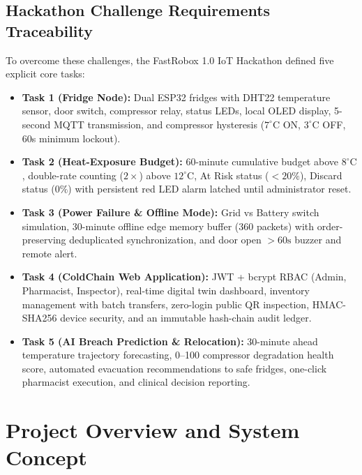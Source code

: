 \documentclass[11pt,a4paper]{article}
\begin{document}
\subsection{Hackathon Challenge Requirements Traceability}
To overcome these challenges, the FastRobox 1.0 IoT Hackathon defined five explicit core tasks:
\begin{itemize}[leftmargin=2em,itemsep=2pt]
    \item \textbf{Task 1 (Fridge Node):} Dual ESP32 fridges with DHT22 temperature sensor, door switch, compressor relay, status LEDs, local OLED display, 5-second MQTT transmission, and compressor hysteresis ($7^\circ\text{C}$ ON, $3^\circ\text{C}$ OFF, 60s minimum lockout).
    \item \textbf{Task 2 (Heat-Exposure Budget):} 60-minute cumulative budget above $8^\circ\text{C}$, double-rate counting ($2\times$) above $12^\circ\text{C}$, At Risk status ($<20\%$), Discard status ($0\%$) with persistent red LED alarm latched until administrator reset.
    \item \textbf{Task 3 (Power Failure \& Offline Mode):} Grid vs Battery switch simulation, 30-minute offline edge memory buffer (360 packets) with order-preserving deduplicated synchronization, and door open $>60\text{s}$ buzzer and remote alert.
    \item \textbf{Task 4 (ColdChain Web Application):} JWT + bcrypt RBAC (Admin, Pharmacist, Inspector), real-time digital twin dashboard, inventory management with batch transfers, zero-login public QR inspection, HMAC-SHA256 device security, and an immutable hash-chain audit ledger.
    \item \textbf{Task 5 (AI Breach Prediction \& Relocation):} 30-minute ahead temperature trajectory forecasting, 0--100 compressor degradation health score, automated evacuation recommendations to safe fridges, one-click pharmacist execution, and clinical decision reporting.
\end{itemize}

\section{Project Overview and System Concept}
\end{document}
